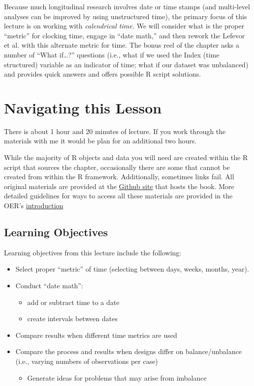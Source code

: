 \documentclass[
  11pt,
]{book}
\providecommand{\tightlist}{%
  \setlength{\itemsep}{0pt}\setlength{\parskip}{0pt}}
\begin{document}
Because much longitudinal research involves date or time stamps (and multi-level analyses can be improved by using unstructured time), the primary focus of this lecture is on working with \emph{calendrical time.} We will consider what is the proper ``metric'' for clocking time, engage in ``date math,'' and then rework the Lefevor et al.\citeyearpar{lefevor_religious_2017} with this alternate metric for time. The bonus reel of the chapter asks a number of ``What if\ldots?'' questions (i.e., what if we used the Index (time structured) variable as an indicator of time; what if our dataset was unbalanced) and provides quick answers and offers possible R script solutions.

\hypertarget{navigating-this-lesson-3}{%
\section{Navigating this Lesson}\label{navigating-this-lesson-3}}

There is about 1 hour and 20 minutes of lecture. If you work through the materials with me it would be plan for an additional two hours.

While the majority of R objects and data you will need are created within the R script that sources the chapter, occasionally there are some that cannot be created from within the R framework. Additionally, sometimes links fail. All original materials are provided at the \href{https://github.com/lhbikos/ReC_CPA}{Github site} that hosts the book. More detailed guidelines for ways to access all these materials are provided in the OER's \protect\hyperlink{ReCintro}{introduction}

\hypertarget{learning-objectives-3}{%
\subsection{Learning Objectives}\label{learning-objectives-3}}

Learning objectives from this lecture include the following:

\begin{itemize}
\tightlist
\item
  Select proper ``metric'' of time (selecting between days, weeks, months, year).
\item
  Conduct ``date math'':

  \begin{itemize}
  \tightlist
  \item
    add or subtract time to a date
  \item
    create intervals between dates
  \end{itemize}
\item
  Compare results when different time metrics are used
\item
  Compare the process and results when designs differ on balance/unbalance (i.e., varying numbers of observations per case)

  \begin{itemize}
  \tightlist
  \item
    Generate ideas for problems that may arise from imbalance
  \end{itemize}
\end{itemize}
\end{document}
